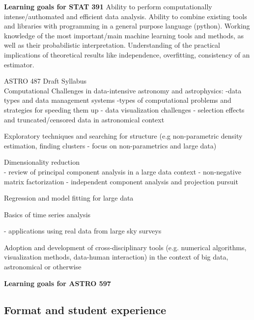 \item[]{\bf Learning goals for STAT 391} Ability to perform computationally intense/authomated and efficient data analysis. Ability to combine existing tools and libraries with programming in a general purpose language (python). 
Working knowledge of the most important/main machine learning tools and methods, as well as their probabilistic interpretation. Understanding of the practical implications of theoretical results like independence, overfitting, consistency of an estimator. 

\item ASTRO 487 Draft Syllabus\\
Computational Challenges in data-intensive astronomy and astrophysics:
-data types and data management systems
-types of computational problems and strategies for speeding them up 
- data visualization challenges
- selection effects and truncated/censored data in astronomical context 

Exploratory techniques and searching for structure (e.g non-parametric density estimation, finding clusters - focus on non-parametrics and large data)

Dimensionality reduction\\
- review of principal component analysis in a large data context
- non-negative matrix factorization 
- independent component analysis and projection pursuit 

Regression and model fitting for large data

Basics of time series analysis

- applications using real data from large sky surveys

Adoption and development of cross-disciplinary tools (e.g. numerical 
algorithms, visualization methods, data-human interaction) in the context
of big data, astronomical or otherwise 
\eit

{\bf Learning goals for ASTRO 597}



\subsection{Format and student experience}

